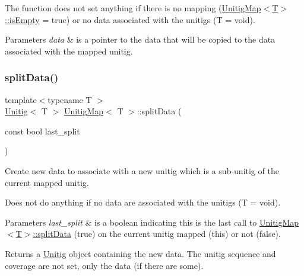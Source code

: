 The function does not set anything if there is no mapping (\hyperlink{structUnitigMap_a152c942911cb2ccf57d4c4c1e3f40178}{Unitig\+Map$<$\+T$>$\+::is\+Empty} = true) or no data associated with the unitigs (T = void). 
\begin{DoxyParams}{Parameters}
{\em data} & is a pointer to the data that will be copied to the data associated with the mapped unitig. \\
\hline
\end{DoxyParams}
\mbox{\label{structUnitigMap_a3b3699727329217e346fadf2d8a987a6}} 
\subsubsection{\texorpdfstring{split\+Data()}{splitData()}}
{\footnotesize\ttfamily template$<$typename T $>$ \\
\hyperlink{classUnitig}{Unitig}$<$ T $>$ \hyperlink{structUnitigMap}{Unitig\+Map}$<$ T $>$\+::split\+Data (\begin{DoxyParamCaption}\item[{const bool}]{last\+\_\+split }\end{DoxyParamCaption})}



Create new data to associate with a new unitig which is a sub-\/unitig of the current mapped unitig. 

Does not do anything if no data are associated with the unitigs (T = void). 
\begin{DoxyParams}{Parameters}
{\em last\+\_\+split} & is a boolean indicating this is the last call to \hyperlink{structUnitigMap_a3b3699727329217e346fadf2d8a987a6}{Unitig\+Map$<$\+T$>$\+::split\+Data} (true) on the current unitig mapped (this) or not (false). \\
\hline
\end{DoxyParams}
\begin{DoxyReturn}{Returns}
a \hyperlink{classUnitig}{Unitig} object containing the new data. The unitig sequence and coverage are not set, only the data (if there are some). 
\end{DoxyReturn}
\mbox{\label{structUnitigMap_a398ca4dd0e422ba08eaad9a11f15a3e3}} 
